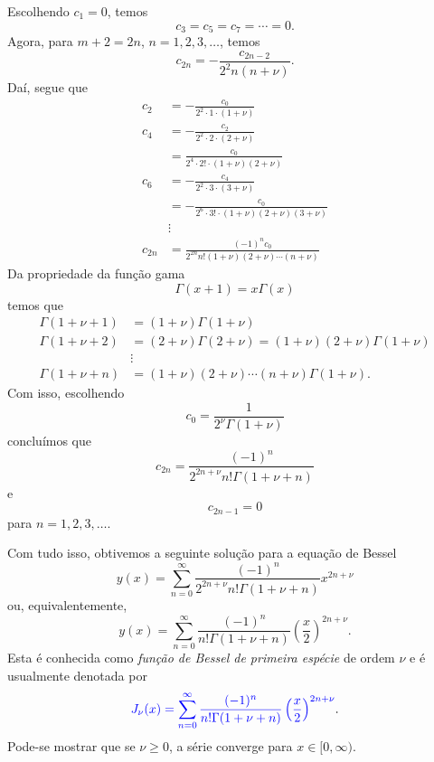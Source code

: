 Escolhendo $c_1=0$, temos
\begin{equation}
  c_3=c_5=c_7=\cdots=0.
\end{equation}
Agora, para $m+2=2n$, $n=1,2,3,\ldots$, temos
\begin{equation}
  c_{2n} = -\frac{c_{2n-2}}{2^2n(n+\nu)}.
\end{equation}
Daí, segue que
\begin{align}
  c_2 &= -\frac{c_0}{2^2\cdot 1\cdot (1+\nu)}\\
  c_4 &= -\frac{c_2}{2^2\cdot 2\cdot (2+\nu)}\\
  &= \frac{c_0}{2^4\cdot 2!\cdot (1+\nu)(2+\nu)}\\
  c_6 &= -\frac{c_4}{2^2\cdot 3\cdot (3+\nu)}\\
  &= -\frac{c_0}{2^6\cdot 3!\cdot (1+\nu)(2+\nu)(3+\nu)}\\
  &\vdots\\
  c_{2n} &= \frac{(-1)^nc_0}{2^{2n}n!(1+\nu)(2+\nu)\cdots(n+\nu)}
\end{align}
Da propriedade da função gama
\begin{equation}
  \Gamma(x+1) = x\Gamma(x)
\end{equation}
temos que
\begin{align}
  \Gamma(1+\nu+1) &= (1+\nu)\Gamma(1+\nu)\\
  \Gamma(1+\nu+2) &= (2+\nu)\Gamma(2+\nu)=(1+\nu)(2+\nu)\Gamma(1+\nu)\\
  &\vdots\\
  \Gamma(1+\nu+n) &= (1+\nu)(2+\nu)\cdots(n+\nu)\Gamma(1+\nu). 
\end{align}
Com isso, escolhendo
\begin{equation}
  c_0 = \frac{1}{2^\nu\Gamma(1+\nu)}
\end{equation}
concluímos que
\begin{equation}
  c_{2n} = \frac{(-1)^n}{2^{2n+\nu}n!\Gamma(1+\nu+n)}
\end{equation}
e
\begin{equation}
  c_{2n-1}=0
\end{equation}
para $n=1,2,3,\ldots$.

Com tudo isso, obtivemos a seguinte solução para a equação de Bessel
\begin{equation}
  y(x) = \sum_{n=0}^\infty \frac{(-1)^n}{2^{2n+\nu}n!\Gamma(1+\nu+n)}x^{2n+\nu}
\end{equation}
ou, equivalentemente,
\begin{equation}
  y(x) = \sum_{n=0}^\infty \frac{(-1)^n}{n!\Gamma(1+\nu+n)}\left(\frac{x}{2}\right)^{2n+\nu}.
\end{equation}
Esta é conhecida como \emph{função de Bessel de primeira espécie} de ordem $\nu$ e é usualmente denotada por
\begin{equation}\label{eq:bessel-1esp-nu}
  {\color{blue}J_\nu(x) = \sum_{n=0}^\infty \frac{(-1)^n}{n!\Gamma(1+\nu+n)}\left(\frac{x}{2}\right)^{2n+\nu}}. 
\end{equation}
Pode-se mostrar que se $\nu\geq 0$, a série converge para $x\in [0, \infty)$.

